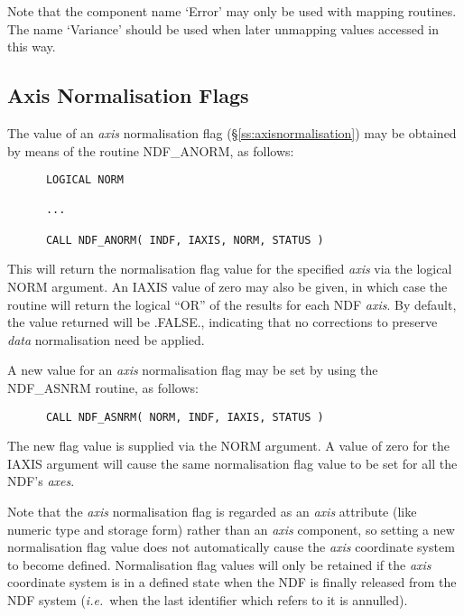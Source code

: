 \documentclass[twoside,11pt]{article}
\newcommand{\htmlref}[2]{#1}
\newcommand{\xlabel}[1]{}
\newcommand{\st}[1]{{\em{#1}}}
\begin{document}
Note that the component name `Error' may only be used with mapping routines.
The name `Variance' should be used when later unmapping values accessed in
this way. 

\subsection{\xlabel{axis_normalisation_flags}Axis Normalisation Flags}

The value of an \st{axis\/} normalisation flag
(\S\ref{ss:axisnormalisation}) may be obtained by means of the routine
\htmlref{NDF\_ANORM}{NDF_ANORM}, as follows: 

\small
\begin{verbatim}
      LOGICAL NORM

      ...

      CALL NDF_ANORM( INDF, IAXIS, NORM, STATUS )
\end{verbatim}
\normalsize

This will return the normalisation flag value for the specified \st{axis\/}
via the logical NORM argument. 
An IAXIS value of zero may also be given, in which case the routine will 
return the logical ``OR'' of the results for each NDF \st{axis}.
By default, the value returned will be .FALSE., indicating that no
corrections to preserve \st{data\/} normalisation need be applied.

A new value for an \st{axis\/} normalisation flag may be set by using the
\htmlref{NDF\_ASNRM}{NDF_ASNRM} routine, as follows: 

\small
\begin{verbatim}
      CALL NDF_ASNRM( NORM, INDF, IAXIS, STATUS )
\end{verbatim}
\normalsize

The new flag value is supplied via the NORM argument.
A value of zero for the IAXIS argument will cause the same normalisation 
flag value to be set for all the NDF's \st{axes}.

Note that the \st{axis\/} normalisation flag is regarded as an \st{axis\/}
attribute (like numeric type and storage form) rather than an \st{axis\/}
component, so setting a new normalisation flag value does not automatically
cause the \st{axis\/} coordinate system to become defined. 
Normalisation flag values will only be retained if the \st{axis\/}
coordinate system is in a defined state when the NDF is finally released
from the NDF system (\st{i.e.}\ when the last identifier which refers to it
is annulled). 
\end{document}
